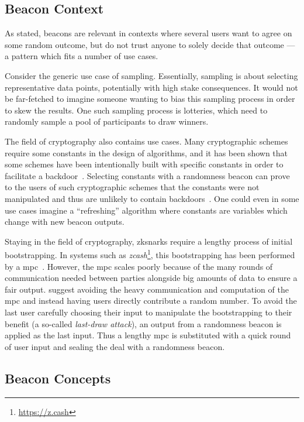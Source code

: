\subsection{Beacon Context}
As stated, beacons are relevant in contexts where several users want to agree on some random outcome, but do not trust anyone to solely decide that outcome --- a pattern which fits a number of use cases.

Consider the generic use case of sampling.
Essentially, sampling is about selecting representative data points, potentially with high stake consequences.
It would not be far-fetched to imagine someone wanting to bias this sampling process in order to skew the results.
One such sampling process is lotteries, which need to randomly sample a pool of participants to draw winners.

The field of cryptography also contains use cases.
Many cryptographic schemes require some constants in the design of algorithms, and it has been shown that some schemes have been intentionally built with specific constants in order to facilitate a backdoor~\cite{nist2014backdoor}.
Selecting constants with a randomness beacon can prove to the users of such cryptographic schemes that the constants were not manipulated and thus are unlikely to contain backdoors~\cite{baigneres2015trap}.
One could even in some use cases imagine a \enquote{refreshing} algorithm where constants are variables which change with new beacon outputs.

Staying in the field of cryptography, \glspl{zksnark} require a lengthy process of initial bootstrapping.
In systems such as \textit{zcash}\footnote{\url{https://z.cash}}, this bootstrapping has been performed by a \gls{mpc}~\cite{snarkparameters}.
However, the \gls{mpc} scales poorly because of the many rounds of communication needed between parties alongside big amounts of data to ensure a fair output.
\citet{mpcsnarks} suggest avoiding the heavy communication and computation of the \gls{mpc} and instead having users directly contribute a random number.
To avoid the last user carefully choosing their input to manipulate the bootstrapping to their benefit (a so-called \emph{last-draw attack}), an output from a randomness beacon is applied as the last input.
Thus a lengthy \gls{mpc} is substituted with a quick round of user input and sealing the deal with a randomness beacon.

\subsection{Beacon Concepts}

